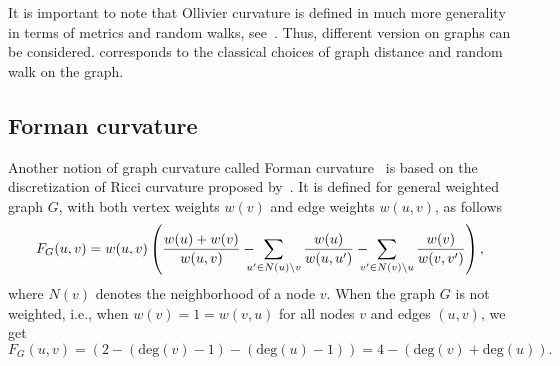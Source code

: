 \documentclass{article} %
\begin{document}
It is important to note that Ollivier curvature is defined in much more generality in terms of metrics and random walks, see~\citep{ollivier2009ricci}. Thus, different version on graphs can be considered.  corresponds to the classical choices of graph distance and random walk on the graph.




\subsection{Forman curvature}

Another notion of graph curvature called Forman curvature~\citep{sreejith2016forman} is based on the discretization of Ricci curvature proposed by~\citet{forman2003bochner}. It is defined for general weighted graph $G$, with both vertex weights $w(v)$ and edge weights $w(u,v)$, as follows
\begin{equation}\label{eq:forman}
	F_G(u,v) = w(u,v) \left(\frac{w(u) + w(v)}{w(u,v)} - \hspace{-8pt}\sum_{u^\prime \in N(u)\setminus v}  \frac{w(u)}{w(u,u^\prime)} - \hspace{-8pt} \sum_{v^\prime \in N(v) \setminus u} \frac{w(v)}{w(v,v^\prime)}\right),
\end{equation}
where $N(v)$ denotes the neighborhood of a node $v$. 
When the graph $G$ is not weighted, i.e., when $w(v) = 1 = w(v,u)$ for all nodes $v$ and edges $(u,v)$, we get
\begin{equation}\label{eq:forman2}
F_G(u,v) = \left(2 - (\mathrm{deg}(v) - 1) - (\mathrm{deg}(u) - 1)\right) = 4 - (\mathrm{deg}(v) + \mathrm{deg}(u)).
\end{equation}
\end{document}
